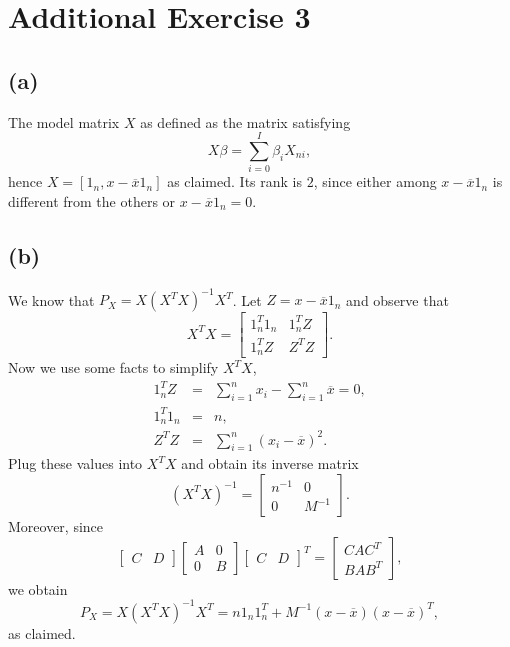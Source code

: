 \section*{Additional Exercise 3}

\subsection*{(a)}
The model matrix $X$ as defined as the matrix satisfying 
\[
X\beta=\sum_{i=0}^{I}\beta_{i}X_{ni},
\]
hence $X=[1_{n},x-\overline{x}1_{n}]$ as claimed. Its rank is $2$,
since either among $x-\overline{x}1_{n}$ is different from the others
or $x-\overline{x}1_{n}=0$.

\subsection*{(b)}
We know that $P_{X}=X(X^{T}X)^{-1}X^{T}$. Let $Z=x-\overline{x}1_{n}$
and observe that 
\[
X^{T}X=\left[\begin{array}{cc}
1_{n}^{T}1_{n} & 1_{n}^{T}Z\\
1_{n}^{T}Z & Z^{T}Z
\end{array}\right].
\]
Now we use some facts to simplify $X^{T}X$,
\begin{eqnarray*}
1_{n}^{T}Z & = & \sum_{i=1}^{n}x_{i}-\sum_{i=1}^{n}\overline{x}=0,\\
1_{n}^{T}1_{n} & = & n,\\
Z^{T}Z & = & \sum_{i=1}^{n}(x_{i}-\overline{x})^{2}.
\end{eqnarray*}
Plug these values into $X^{T}X$ and obtain its inverse matrix
\[
(X^{T}X)^{-1}=\left[\begin{array}{cc}
n^{-1} & 0\\
0 & M^{-1}
\end{array}\right].
\]
Moreover, since 
\[
\left[\begin{array}{cc}
C & D\end{array}\right]\left[\begin{array}{cc}
A & 0\\
0 & B
\end{array}\right]\left[\begin{array}{cc}
C & D\end{array}\right]^{T}=\left[\begin{array}{c}
CAC^{T}\\
BAB^{T}
\end{array}\right],
\]
we obtain
\[
P_{X}=X(X^{T}X)^{-1}X^{T}=n1_{n}1_{n}^{T}+M^{-1}(x-\overline{x})(x-\overline{x})^{T},
\]
as claimed.

